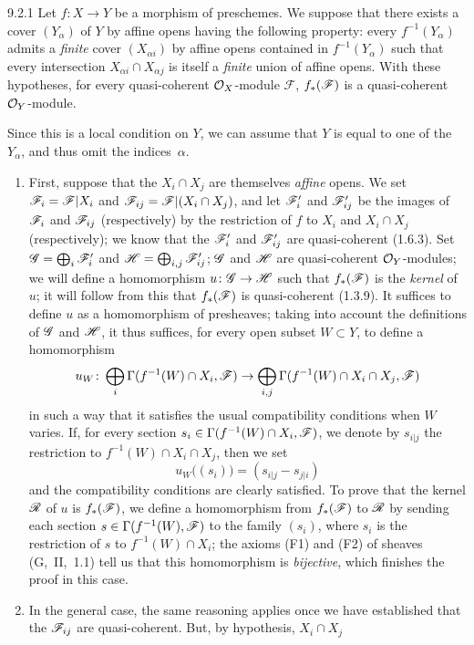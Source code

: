 \documentclass[../main.tex]{subfiles}
\begin{document}
\begin{cx}[Proposition]{9.2.1}
    Let $f\colon X\to Y$ be a morphism of preschemes.
    We suppose that there exists a cover $(Y_\alpha)$ of $Y$ by affine opens having the following property: every $f^{-1}(Y_\alpha)$ admits a \emph{finite} cover $(X_{\alpha i})$ by affine opens contained in $f^{-1}(Y_\alpha)$ such that every intersection $X_{\alpha i}\cap X_{\alpha j}$ is itself a \emph{finite} union of affine opens.
    With these hypotheses, for every quasi-coherent $\mathcal{O}_X$-module $\mathscr{F}$, $f_*(\mathscr{F})$ is a quasi-coherent $\mathcal{O}_Y$-module.
\end{cx}

Since this is a local condition on $Y$, we can assume that $Y$ is equal to one of the $Y_\alpha$, and thus omit the indices~$\alpha$.

\begin{enumerate}[label=\alph*)]
    \item First, suppose that the $X_i\cap X_j$ are themselves \emph{affine} opens.
        We set $\mathscr{F}_i=\mathscr{F}|X_i$ and $\mathscr{F}_{ij}=\mathscr{F}|(X_i\cap X_j)$, and let $\mathscr{F}'_i$ and $\mathscr{F}'_{ij}$ be the images of $\mathscr{F}_i$ and $\mathscr{F}_{ij}$ (respectively) by the restriction of $f$ to $X_i$ and $X_i\cap X_j$ (respectively); we know that the $\mathscr{F}'_i$ and $\mathscr{F}'_{ij}$ are quasi-coherent (1.6.3).
        Set $\mathscr{G}=\bigoplus_i\mathscr{F}'_i$ and $\mathscr{H}=\bigoplus_{i,j}\mathscr{F}'_{ij}$; $\mathscr{G}$ and $\mathscr{H}$ are quasi-coherent $\mathcal{O}_Y$-modules; we will define a homomorphism $u\colon\mathscr{G}\to\mathscr{H}$ such that $f_*(\mathscr{F})$ is the \emph{kernel} of $u$; it will follow from this that $f_*(\mathscr{F})$ is quasi-coherent (1.3.9).
        It suffices to define $u$ as a homomorphism of presheaves; taking into account the definitions of $\mathscr{G}$ and $\mathscr{H}$, it thus suffices, for every open subset $W\subset Y$, to define a homomorphism
        \begin{equation*}
            u_W\colon \bigoplus_i\Gamma(f^{-1}(W)\cap X_i, \mathscr{F}) \to \bigoplus_{i,j}\Gamma(f^{-1}(W)\cap X_i\cap X_j, \mathscr{F})
        \end{equation*}
        in such a way that it satisfies the usual compatibility conditions when $W$ varies.
        If, for every section $s_i\in\Gamma(f^{-1}(W)\cap X_i, \mathscr{F})$, we denote by $s_{i|j}$ the restriction to $f^{-1}(W)\cap X_i\cap X_j$, then we set
        \begin{equation*}
            u_W\big((s_i)\big) = (s_{i|j}-s_{j|i})
        \end{equation*}
        and the compatibility conditions are clearly satisfied.
        To prove that the kernel $\mathscr{R}$ of $u$ is $f_*(\mathscr{F})$, we define a homomorphism from $f_*(\mathscr{F})$ to $\mathscr{R}$ by sending each section $s\in\Gamma(f^{-1}(W), \mathscr{F})$ to the family $(s_i)$, where $s_i$ is the restriction of $s$ to $f^{-1}(W)\cap X_i$; the axioms (F1) and (F2) of sheaves (G,~II,~1.1) tell us that this homomorphism is \emph{bijective}, which finishes the proof in this case.
    \item In the general case, the same reasoning applies once we have established that the $\mathscr{F}_{ij}$ are quasi-coherent.
    But, by hypothesis, $X_i\cap X_j$ 
\end{enumerate}
\end{document}
